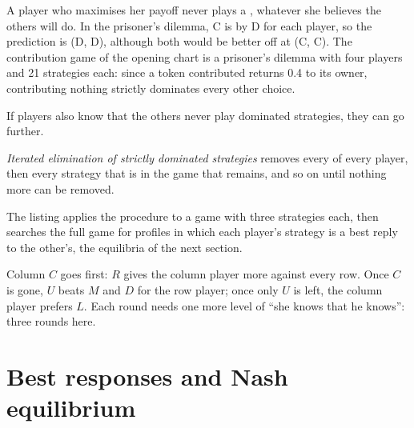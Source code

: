 A player who maximises her payoff never plays a , whatever she believes the
others will do. In the prisoner's dilemma, C is  by D for each player, so the prediction
is (D, D), although both would be better off at (C, C). The contribution game of the opening chart is a
prisoner's dilemma with four players and 21 strategies each: since a token contributed returns 0.4 to its
owner, contributing nothing strictly dominates every other choice.

If players also know that the others never play dominated strategies, they can go further.

\begin{definition}\label{def:b2:static-games:iesds}
\emph{Iterated elimination of strictly dominated strategies} removes every  of every player, then every strategy that
is  in the game that remains, and so on until nothing more can be removed.
\end{definition}

The listing applies the procedure to a game with three strategies each, then searches the full game for
profiles in which each player's strategy is a best reply to the other's, the equilibria of the next
section.

\label{lst:b2:static-games:dominance}

\label{out:b2:static-games:dominance}

Column $C$ goes first: $R$ gives the column player more against every row. Once $C$ is gone, $U$ beats $M$ and
$D$ for the row player; once only $U$ is left, the column player prefers $L$. Each round needs one more level
of ``she knows that he knows'': three rounds here.

\section{Best responses and Nash equilibrium}\label{sec:b2:static-games:nash}

